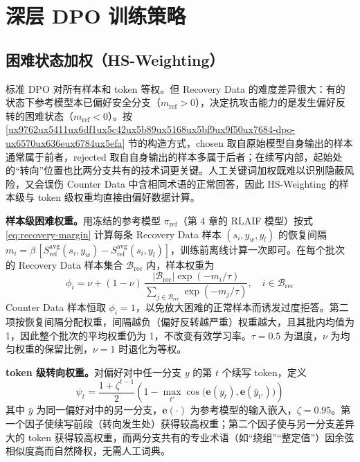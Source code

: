 \documentclass[fontset=fandol,type=master,campus=shenzhen,etitleauto=true]{hithesisbook}
\begin{document}
\section{深层 DPO 训练策略}\label{ux6df1ux5c42-dpo-ux8badux7ec3ux7b56ux7565}

\subsection{困难状态加权（HS-Weighting）}\label{rt-weighting}

标准 DPO 对所有样本和 token 等权。但 Recovery Data 的难度差异很大：有的状态下参考模型本已偏好安全分支（$m_{\text{ref}} > 0$），决定抗攻击能力的是发生偏好反转的困难状态（$m_{\text{ref}} < 0$）。按 \ref{ux9762ux5411ux6df1ux5c42ux5b89ux5168ux5bf9ux9f50ux7684-dpo-ux6570ux636eux6784ux5efa} 节的构造方式，chosen 取自原始模型自身输出的样本通常属于前者，rejected 取自自身输出的样本多属于后者；在续写内部，起始处的“转向”位置也比两分支共有的技术词更关键。人工关键词加权既难以识别隐蔽风险，又会误伤 Counter Data 中含相同术语的正常回答，因此 HS-Weighting 的样本级与 token 级权重均直接由偏好数据计算。

\textbf{样本级困难权重。}用冻结的参考模型 $\pi_{\text{ref}}$（第 4 章的 RLAIF 模型）按式 \eqref{eq:recovery-margin} 计算每条 Recovery Data 样本 $(s_i, y_w, y_l)$ 的恢复间隔 $m_i = \beta\,[S^{\text{avg}}_{\text{ref}}(s_i, y_w) - S^{\text{avg}}_{\text{ref}}(s_i, y_l)]$，训练前离线计算一次即可。在每个批次的 Recovery Data 样本集合 $\mathcal{B}_{\text{rec}}$ 内，样本权重为
\begin{equation}
\phi_i = \nu + (1 - \nu)\,\frac{|\mathcal{B}_{\text{rec}}| \exp(-m_i / \tau)}{\sum_{j \in \mathcal{B}_{\text{rec}}} \exp(-m_j / \tau)}, \quad i \in \mathcal{B}_{\text{rec}}
\end{equation}
Counter Data 样本恒取 $\phi_i = 1$，以免放大困难的正常样本而诱发过度拒答。第二项按恢复间隔分配权重，间隔越负（偏好反转越严重）权重越大，且其批内均值为 1，因此整个批次的平均权重仍为 1，不改变有效学习率。$\tau = 0.5$ 为温度，$\nu$ 为均匀权重的保留比例，$\nu = 1$ 时退化为等权。

\textbf{token 级转向权重。}对偏好对中任一分支 $y$ 的第 $t$ 个续写 token，定义
\begin{equation}
\psi_t = \frac{1 + \zeta^{t-1}}{2} \left( 1 - \max_{t'} \cos\!\big(\mathbf{e}(y_t), \mathbf{e}(\bar{y}_{t'})\big) \right)
\end{equation}
其中 $\bar{y}$ 为同一偏好对中的另一分支，$\mathbf{e}(\cdot)$ 为参考模型的输入嵌入，$\zeta = 0.95$。第一个因子使续写前段（转向发生处）获得较高权重；第二个因子使与另一分支差异大的 token 获得较高权重，而两分支共有的专业术语（如“绕组”“整定值”）因余弦相似度高而自然降权，无需人工词典。
\end{document}
